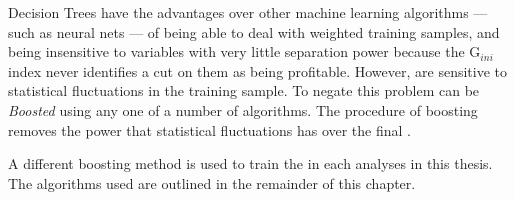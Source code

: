 Decision Trees have the advantages over other machine learning algorithms ---
such as neural nets --- of being able to deal with weighted training samples, and being insensitive
to variables with very little separation power because the
$\mathrm{G}_{ini}$ index never identifies a cut on them as being profitable.
However, \DTs are sensitive to statistical fluctuations in the training sample.
To negate this problem \DTs can be \emph{Boosted} using any one of a number of algorithms.
The procedure of boosting removes the power that statistical fluctuations has over the final
\BDT.

A different boosting method is used to train the \BDTs in each analyses in this thesis.
The algorithms used are outlined in the remainder of this chapter.



